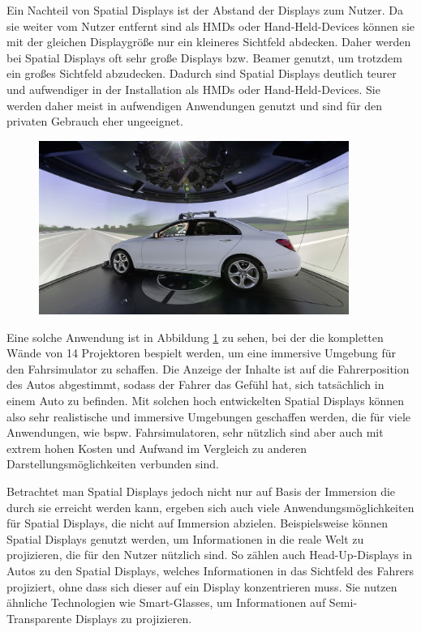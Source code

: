   Ein Nachteil von Spatial Displays ist der Abstand der Displays zum Nutzer.
  Da sie weiter vom Nutzer entfernt sind als HMDs oder Hand-Held-Devices können sie mit der gleichen Displaygröße nur ein kleineres Sichtfeld abdecken.
  Daher werden bei Spatial Displays oft sehr große Displays bzw. Beamer genutzt, um trotzdem ein großes Sichtfeld abzudecken.
  Dadurch sind Spatial Displays deutlich teurer und aufwendiger in der Installation als HMDs oder Hand-Held-Devices.
  Sie werden daher meist in aufwendigen Anwendungen genutzt und sind für den privaten Gebrauch eher ungeeignet.

  \begin{figure}[H]
    \centering
    \includegraphics[width=0.9\textwidth]{images/merc-sim.png}
    \label{fig:merc-sim}
  \end{figure}

  Eine solche Anwendung ist in Abbildung \ref{fig:merc-sim} zu sehen, bei der die kompletten Wände von 14 Projektoren bespielt werden, um eine immersive Umgebung für den Fahrsimulator zu schaffen.
  Die Anzeige der Inhalte ist auf die Fahrerposition des Autos abgestimmt, sodass der Fahrer das Gefühl hat, sich tatsächlich in einem Auto zu befinden.
  Mit solchen hoch entwickelten Spatial Displays können also sehr realistische und immersive Umgebungen geschaffen werden, die für viele Anwendungen, wie bspw. Fahrsimulatoren, sehr nützlich sind aber auch mit extrem hohen Kosten und Aufwand im Vergleich zu anderen Darstellungsmöglichkeiten verbunden sind.

  Betrachtet man Spatial Displays jedoch nicht nur auf Basis der Immersion die durch sie erreicht werden kann, ergeben sich auch viele Anwendungsmöglichkeiten für Spatial Displays, die nicht auf Immersion abzielen.
  Beispielsweise können Spatial Displays genutzt werden, um Informationen in die reale Welt zu projizieren, die für den Nutzer nützlich sind.
  So zählen auch Head-Up-Displays in Autos zu den Spatial Displays, welches Informationen in das Sichtfeld des Fahrers projiziert, ohne dass sich dieser auf ein Display konzentrieren muss.
  Sie nutzen ähnliche Technologien wie Smart-Glasses, um Informationen auf Semi-Transparente Displays zu projizieren.

